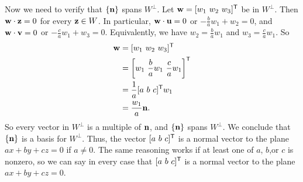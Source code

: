 \begin{example}
Now we need to verify that $\{\mathbf{n}\}$ spans $W^{\perp}$. Let $\mathbf{w} = [w_1 \ w_2 \ w_3]^{\mathsf{T}}$ be in $W^{\perp}$. Then $\mathbf{w} \cdot \mathbf{z} = 0$ for every $\mathbf{z} \in W$. In particular, $\mathbf{w} \cdot \mathbf{u} = 0$ or $-\frac{b}{a}w_1 + w_2 = 0$, and $\mathbf{w} \cdot \mathbf{v} = 0$ or $-\frac{c}{a}w_1 + w_3 = 0$. Equivalently, we have $w_2 = \frac{b}{a}w_1$ and $w_3 = \frac{c}{a}w_1$. So 
\begin{align*}
\mathbf{w} &=  [w_1 \ w_2 \ w_3]^{\mathsf{T}} \\
	&= \left[ w_1 \ \frac{b}{a}w_1 \ \frac{c}{a}w_1\right]^{\mathsf{T}} \\
	&= \frac{1}{a}[a \ b \ c]^{\mathsf{T}}w_1 \\
	&= \frac{w_1}{a} \mathbf{n}.
\end{align*}
So every vector in $W^{\perp}$ is a multiple of $\mathbf{n}$, and $\{\mathbf{n}\}$ spans $W^{\perp}$. We conclude that $\{\mathbf{n}\}$ is a basis for $W^{\perp}$.  Thus, the vector $[a \ b \ c]^{\mathsf{T}}$ is a normal vector to the plane $ax+by+cz=0$ if $a \neq 0$. The same reasoning works if at least one of $a$, $b$,or $c$ is nonzero, so we can say in every case that $[a \ b \ c]^{\mathsf{T}}$ is a normal vector to the plane $ax+by+cz=0$.

\ea

\end{example}


